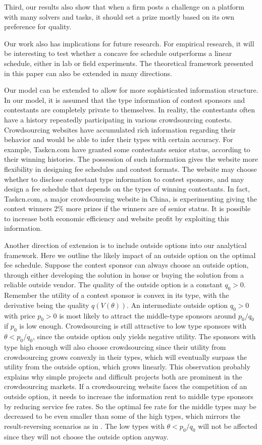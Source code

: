 \documentclass[12pt]{article}
\begin{document}
Third, our results also show that when a firm posts a challenge on a platform with many solvers and tasks, it should set a prize mostly based on its own preference for quality.

Our work also has implications for future research. For empirical research, it will be interesting to test whether a concave fee schedule outperforms a linear schedule, either in lab or field experiments. The theoretical framework presented in this paper can also be extended in many directions.

Our model can be extended to allow for more sophisticated information structure. In our model, it is assumed that the type information of contest sponsors and contestants are completely private to themselves. In reality, the contestants often have a history repeatedly participating in various crowdsourcing contests. Crowdsourcing websites have accumulated rich information regarding their behavior and would be able to infer their types with certain accuracy. For example, Taskcn.com have granted some contestants senior status, according to their winning histories. The possession of such information gives the website more flexibility in designing fee schedules and contest formats. The website may choose whether to disclose contestant type information to contest sponsors, and may design a fee schedule that depends on the types of winning contestants. In fact, Taskcn.com, a major crowdsourcing website in China, is experimenting giving the contest winners 2\% more prizes if the winners are of senior status. It is possible to increase both economic efficiency and website profit by exploiting this information.

Another direction of extension is to include outside options into our analytical framework. Here we outline the likely impact of an outside option on the optimal fee schedule. Suppose the contest sponsor can always choose an outside option, through either developing the solution in house or buying the solution from a reliable outside vendor. The quality of the outside option is a constant $q_{0}>0$.
Remember the utility of a contest sponsor is convex in its type, with
the derivative being the quality $q(V(\theta))$. An intermediate
outside option $q_{0}>0$ with price $p_{0}>0$ is most likely to
attract the middle-type sponsors around $p_{0}/q_{0}$ if $p_{0}$
is low enough. Crowdsourcing is still attractive to low type sponsors
with $\theta<p_{0}/q_{0}$, since the outside option only yields negative
utility. The sponsors with type high enough will also choose crowdsourcing
since their utility from crowdsourcing grows convexly in their types,
which will eventually surpass the utility from the outside option,
which grows linearly. This observation probably explains why simple
projects and difficult projects both are prominent in the crowdsourcing
markets. If a crowdsourcing website faces the competition of an outside
option, it needs to increase the information rent to middle type sponsors
by reducing service fee rates. So the optimal fee rate for the middle
types may be decreased to be even smaller than some of the high types,
which mirrors the result-reversing scenarios as in \citet{Lewis:1988}.
The low types with $\theta<p_{0}/q_{0}$ will not be affected since
they will not choose the outside option anyway.
\end{document}
